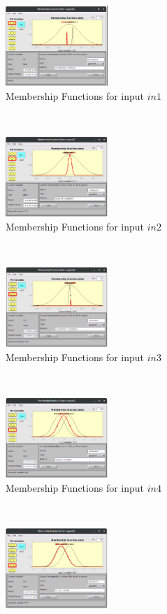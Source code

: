 \documentclass[11pt]{article}
\begin{document}
\begin{figure}[ht]
	\centering
	\begin{subfigure}[t]{0.3\textwidth}
		\centering
		\includegraphics[height=1.2in]{images/fcm_hybrid_in1}
		\caption{Membership Functions for input $in1$}
	\end{subfigure}
	~ 
	\begin{subfigure}[t]{0.3\textwidth}
		\centering
		\includegraphics[height=1.2in]{images/fcm_hybrid_in2}
		\caption{Membership Functions for input $in2$}
	\end{subfigure}
	~
	\begin{subfigure}[t]{0.3\textwidth}
		\centering
		\includegraphics[height=1.2in]{images/fcm_hybrid_in3}
		\caption{Membership Functions for input $in3$}
	\end{subfigure}
	\\
	\begin{subfigure}[t]{0.3\textwidth}
		\centering
		\includegraphics[height=1.2in]{images/fcm_hybrid_in4}
		\caption{Membership Functions for input $in4$}
	\end{subfigure}
	~ 
	\begin{subfigure}[t]{0.3\textwidth}
		\centering
		\includegraphics[height=1.2in]{images/fcm_hybrid_in5}

\end{subfigure}
\end{figure}
\end{document}
